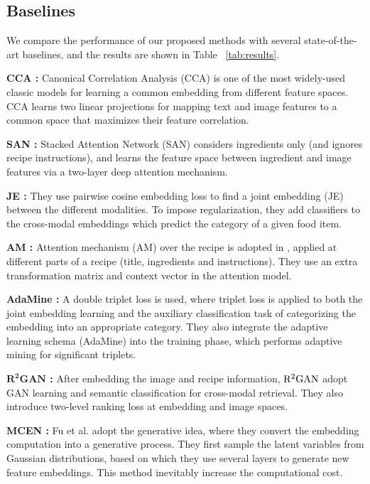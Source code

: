 \documentclass[journal]{IEEEtran}
\begin{document}
\subsection{Baselines}
We compare the performance of our proposed methods with several state-of-the-art baselines, and the results are shown in Table ~\ref{tab:results}.

\textbf{CCA \cite{hotelling1936relations}:} Canonical Correlation Analysis (CCA) is one of the most widely-used classic models for learning a common embedding from different feature spaces. CCA learns two linear projections for mapping text and image features to a common space that maximizes their feature correlation. 

\textbf{SAN \cite{chen2017cross}:} Stacked Attention Network (SAN) considers ingredients only (and ignores recipe instructions), and learns the feature space between ingredient and image features via a two-layer deep attention mechanism.

\textbf{JE \cite{salvador2017learning}:} They use pairwise cosine embedding loss to find a joint embedding (JE) between the different modalities. To impose regularization, they add classifiers to the cross-modal embeddings which predict the category of a given food item.

\textbf{AM \cite{chen2018deep}:} Attention mechanism (AM) over the recipe is adopted in \cite{chen2018deep}, applied at different parts of a recipe (title, ingredients and instructions). They use an extra transformation matrix and context vector in the attention model.

\textbf{AdaMine \cite{carvalho2018cross}:} A double triplet loss is used, where triplet loss is applied to both the joint embedding learning and the auxiliary classification task of categorizing the embedding into an appropriate category. They also integrate the adaptive learning schema (AdaMine) into the training phase, which performs adaptive mining for significant triplets.

\textbf{$\mathbf{R^2 GAN}$ \cite{zhu2019r2gan}:} After embedding the image and recipe information, $\rm R^2 GAN$ adopt GAN learning and semantic classification for cross-modal retrieval. They also introduce two-level ranking loss at embedding and image spaces.

\textbf{MCEN \cite{fu2020mcen}:} Fu et al. adopt the generative idea, where they convert the embedding computation into a generative process. They first sample the latent variables from Gaussian distributions, based on which they use several layers to generate new feature embeddings. This method inevitably increase the computational cost.
\end{document}

